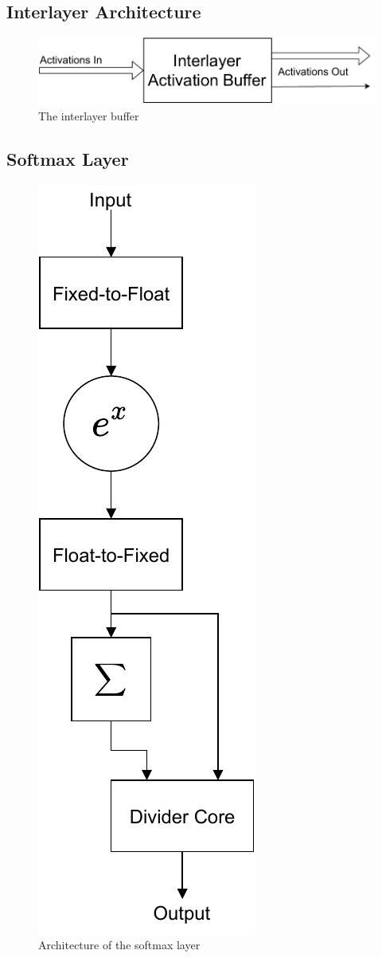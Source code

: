 \subsection{Interlayer Architecture}
\begin{figure}
	\centering 
	\includegraphics[width=\textwidth]{figures/interlayer_buffer}
	\caption{The interlayer buffer}\label{softmax-arch}
\end{figure}
\subsection{Softmax Layer}
\begin{figure}
	\centering 
	\includegraphics{figures/softmax}
	\caption{Architecture of the softmax layer}\label{softmax-arch}
\end{figure}
